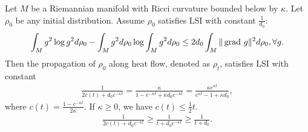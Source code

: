 
\begin{proposition}\label{LSI_Propagation_Heat}
    Let $M$ be a Riemannian manifold with Ricci curvature bounded below by $\kappa$.
    Let $\rho_{0}$ be any initial distribution.
    Assume $\rho_{0}$ satisfies LSI with constant $\frac{1}{d_{0}}$:
    \begin{align*}
        \int_{M} g^{2} \log g^{2} d\rho_{0} - \int_{M} g^{2} d\rho_{0} \log \int_{M} g^{2} d\rho_{0} 
        \le 2 d_{0} \int_{M} \|\operatorname{grad\,} g\|^{2} d\rho_{0}, \forall g.
    \end{align*}
    Then the propagation of $\rho_{0}$ along heat flow, denoted as $\rho_{t}$, 
    satisfies LSI with constant 
    \begin{align*}
        \frac{1}{2c(t) + d_{0}e^{-\kappa t}} 
        = \frac{\kappa}{1 - e^{-\kappa t} + \kappa d_{0}e^{-\kappa t}} 
        = \frac{\kappa e^{\kappa t}}{e^{\kappa t} - 1 + \kappa d_{0}},
    \end{align*}
    where $c(t) = \frac{1 - e^{-\kappa t}}{2\kappa} $.
    If $\kappa \ge 0$, we have $c(t) \le \frac{1}{2} t$.
    \begin{align*}
        \frac{1}{2c(t) + d_{0}e^{-\kappa t}} 
        \ge \frac{1}{t + d_{0}e^{-\kappa t}} \ge \frac{1}{t + d_{0}}.
    \end{align*}
\end{proposition}
